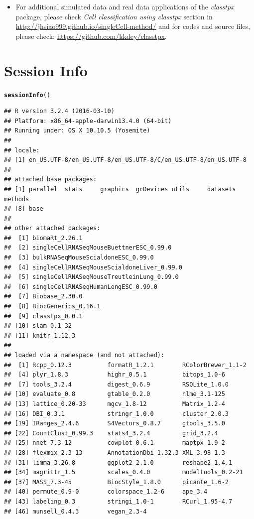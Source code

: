\documentclass[12pt]{article}\usepackage[]{graphicx}\usepackage[usenames,dvipsnames]{color}
\makeatletter
\newcommand{\hlstd}[1]{\textcolor[rgb]{0.345,0.345,0.345}{#1}}%
\newcommand{\hlkwd}[1]{\textcolor[rgb]{0.737,0.353,0.396}{\textbf{#1}}}%
\newenvironment{kframe}{%
 \def\at@end@of@kframe{}%
 \ifinner\ifhmode%
  \def\at@end@of@kframe{\end{minipage}}%
  \begin{minipage}{\columnwidth}%
 \fi\fi%
 \def\FrameCommand##1{\hskip\@totalleftmargin \hskip-\fboxsep
 \colorbox{shadecolor}{##1}\hskip-\fboxsep
     \hskip-\linewidth \hskip-\@totalleftmargin \hskip\columnwidth}%
 \MakeFramed {\advance\hsize-\width
   \@totalleftmargin\z@ \linewidth\hsize
   \@setminipage}}%
 {\par\unskip\endMakeFramed%
 \at@end@of@kframe}
\newenvironment{knitrout}{}{} %
\newcommand{\classtpx}{\textit{classtpx}}
\makeatother
\begin{document}
\begin{itemize}
\item For additional simulated data and  real data applications of the \classtpx{} package, please check \textit{Cell classification using classtpx} section in \url{http://jhsiao999.github.io/singleCell-method/} and for codes and source files, please check: \url{https://github.com/kkdey/classtpx}.

\end{itemize}


\section{Session Info}

\begin{knitrout}
\color{fgcolor}\begin{kframe}
\begin{alltt}
\hlkwd{sessionInfo}\hlstd{()}
\end{alltt}
\begin{verbatim}
## R version 3.2.4 (2016-03-10)
## Platform: x86_64-apple-darwin13.4.0 (64-bit)
## Running under: OS X 10.10.5 (Yosemite)
## 
## locale:
## [1] en_US.UTF-8/en_US.UTF-8/en_US.UTF-8/C/en_US.UTF-8/en_US.UTF-8
## 
## attached base packages:
## [1] parallel  stats     graphics  grDevices utils     datasets  methods  
## [8] base     
## 
## other attached packages:
##  [1] biomaRt_2.26.1                            
##  [2] singleCellRNASeqMouseBuettnerESC_0.99.0   
##  [3] bulkRNASeqMouseScialdoneESC_0.99.0        
##  [4] singleCellRNASeqMouseScialdoneLiver_0.99.0
##  [5] singleCellRNASeqMouseTreutleinLung_0.99.0 
##  [6] singleCellRNASeqHumanLengESC_0.99.0       
##  [7] Biobase_2.30.0                            
##  [8] BiocGenerics_0.16.1                       
##  [9] classtpx_0.0.1                            
## [10] slam_0.1-32                               
## [11] knitr_1.12.3                              
## 
## loaded via a namespace (and not attached):
##  [1] Rcpp_0.12.3          formatR_1.2.1        RColorBrewer_1.1-2  
##  [4] plyr_1.8.3           highr_0.5.1          bitops_1.0-6        
##  [7] tools_3.2.4          digest_0.6.9         RSQLite_1.0.0       
## [10] evaluate_0.8         gtable_0.2.0         nlme_3.1-125        
## [13] lattice_0.20-33      mgcv_1.8-12          Matrix_1.2-4        
## [16] DBI_0.3.1            stringr_1.0.0        cluster_2.0.3       
## [19] IRanges_2.4.6        S4Vectors_0.8.7      gtools_3.5.0        
## [22] CountClust_0.99.3    stats4_3.2.4         grid_3.2.4          
## [25] nnet_7.3-12          cowplot_0.6.1        maptpx_1.9-2        
## [28] flexmix_2.3-13       AnnotationDbi_1.32.3 XML_3.98-1.3        
## [31] limma_3.26.8         ggplot2_2.1.0        reshape2_1.4.1      
## [34] magrittr_1.5         scales_0.4.0         modeltools_0.2-21   
## [37] MASS_7.3-45          BiocStyle_1.8.0      picante_1.6-2       
## [40] permute_0.9-0        colorspace_1.2-6     ape_3.4             
## [43] labeling_0.3         stringi_1.0-1        RCurl_1.95-4.7      
## [46] munsell_0.4.3        vegan_2.3-4
\end{verbatim}
\end{kframe}
\end{knitrout}
\end{document}
